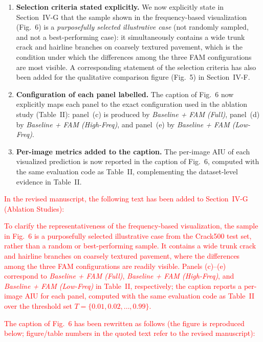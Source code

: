 \documentclass[letterpaper,journal,onecolumn,12pt]{IEEEtran}
\begin{document}
\begin{enumerate}
    \item \textbf{Selection criteria stated explicitly.}
    We now explicitly state in Section~IV-G that the sample shown in the frequency-based visualization (Fig.~6) is a
    \emph{purposefully selected illustrative case} (not randomly sampled, and not a best-performing case):
    it simultaneously contains a wide trunk crack and hairline branches on coarsely textured pavement, which is the
    condition under which the differences among the three FAM configurations are most visible.
    A corresponding statement of the selection criteria has also been added for the qualitative comparison figure
    (Fig.~5) in Section~IV-F.

    \item \textbf{Configuration of each panel labelled.}
    The caption of Fig.~6 now explicitly maps each panel to the exact configuration used in the ablation study
    (Table~II): panel~(c) is produced by \emph{Baseline + FAM (Full)}, panel~(d) by
    \emph{Baseline + FAM (High-Freq)}, and panel~(e) by \emph{Baseline + FAM (Low-Freq)}.

    \item \textbf{Per-image metrics added to the caption.}
    The per-image AIU of each visualized prediction is now reported in the caption of Fig.~6, computed with the same
    evaluation code as Table~II, complementing the dataset-level evidence in Table~II.
\end{enumerate}

\textcolor{red}{In the revised manuscript, the following text has been added to Section~IV-G (Ablation Studies):}

\textcolor{red}{
To clarify the representativeness of the frequency-based visualization, the sample in Fig.~6 is a purposefully
selected illustrative case from the Crack500 test set, rather than a random or best-performing sample.
It contains a wide trunk crack and hairline branches on coarsely textured pavement, where the differences among the
three FAM configurations are readily visible. Panels (c)--(e) correspond to
\emph{Baseline + FAM (Full)}, \emph{Baseline + FAM (High-Freq)}, and
\emph{Baseline + FAM (Low-Freq)} in Table~II, respectively; the caption reports a per-image AIU for each panel, computed with the same evaluation code as Table~II over the threshold set $T=\{0.01, 0.02, \ldots, 0.99\}$.
}

\textcolor{red}{The caption of Fig.~6 has been rewritten as follows (the figure is reproduced below; figure/table numbers in the quoted text refer to the revised manuscript):}
\end{document}
